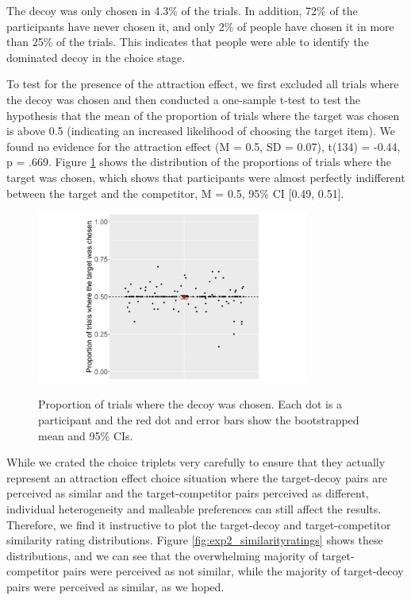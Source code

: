 \documentclass[12pt, a4paper]{article}
\begin{document}
The decoy was only chosen in 4.3\% of the trials. In addition, 72\% of the participants have never chosen it, and only 2\% of people have chosen it in more than 25\% of the trials. This indicates that people were able to identify the dominated decoy in the choice stage.

To test for the presence of the attraction effect, we first excluded all trials where the decoy was chosen and then conducted a one-sample t-test to test the hypothesis that the mean of the proportion of trials where the target was chosen is above 0.5 (indicating an increased likelihood of choosing the target item). We found no evidence for the attraction effect (M = 0.5, SD = 0.07), t(134) = -0.44, p = .669. Figure \ref{fig:exp2_res} shows the distribution of the proportions of trials where the target was chosen, which shows that participants were almost perfectly indifferent between the target and the competitor, M = 0.5, 95\% CI [0.49, 0.51].



\begin{figure}[htb!]
\centering
\captionsetup{justification=centering}
\caption{Proportion of trials where the decoy was chosen. Each dot is a participant and the red dot and error bars show the bootstrapped mean and 95\% CIs.}
\includegraphics[width=0.8\textwidth]{exp2_res.png}
\label{fig:exp2_res}
\end{figure}

While we crated the choice triplets very carefully to ensure that they actually represent an attraction effect choice situation where the target-decoy pairs are perceived as similar and the target-competitor pairs perceived as different, individual heterogeneity and malleable preferences can still affect the results. Therefore, we find it instructive to plot the target-decoy and target-competitor similarity rating distributions. Figure \ref{fig:exp2_similarityratings} shows these distributions, and we can see that the overwhelming majority of target-competitor pairs were perceived as not similar, while the majority of target-decoy pairs were perceived as similar, as we hoped.
\end{document}
